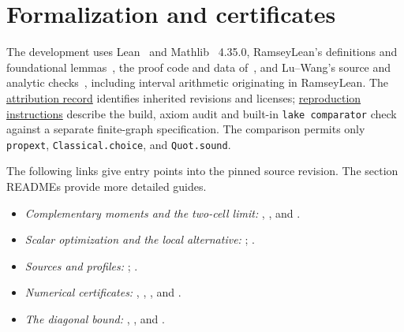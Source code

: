 \section{Formalization and certificates}
\label{sec:formalization}

The development uses Lean~\cite{Lean} and Mathlib~\cite{Mathlib}
4.35.0, RamseyLean's definitions and foundational lemmas~\cite{RamseyLean,GNNW},
the proof code and data of~\cite{ZBS}, and Lu--Wang's source and
analytic checks~\cite{LW}, including interval arithmetic originating
in RamseyLean. The \href{\leanrepo/NOTICE.md}{attribution record}
identifies inherited revisions and licenses;
\href{\leanrepo/Scripts/README.md}{reproduction instructions} describe
the build, axiom audit and built-in \texttt{lake comparator} check
against a separate finite-graph specification. The comparison permits only
\texttt{propext}, \texttt{Classical.choice}, and \texttt{Quot.sound}.

The following links give entry points into the pinned source revision.
The section READMEs provide more detailed guides.

\begin{itemize}
\item \emph{Complementary moments and the two-cell limit:}
,
, and
.
\item \emph{Scalar optimization and the local alternative:}
;
.
\item \emph{Sources and profiles:}
;
.
\item \emph{Numerical certificates:}
,
,
, and
.
\item \emph{The diagonal bound:}
,
, and
.
\end{itemize}
